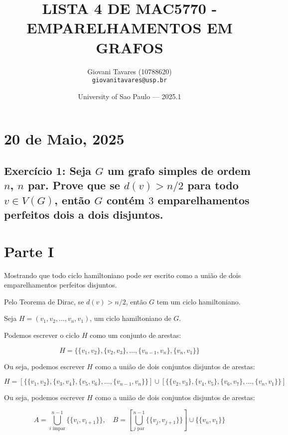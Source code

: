 \documentclass{article}
\title{LISTA 4 DE MAC5770 - EMPARELHAMENTOS EM GRAFOS} %
\author{Giovani Tavares (10788620)\\ \texttt{giovanitavares@usp.br}} %
\date{University of Sao Paulo --- 2025.1} %
\begin{document}
\maketitle %


\section{20 de Maio, 2025} %


 \subsection{Exercício 1:  Seja $G$ um grafo simples de ordem $n$, $n$ par. Prove que se $d(v) > n/2$ para todo $v \in V (G)$, então $G$ contém $3$ emparelhamentos perfeitos dois a dois disjuntos.}
 
 \section*{Parte I}
 
 Mostrando que todo ciclo hamiltoniano pode ser escrito como a união de dois emparelhamentos perfeitos disjuntos.
 
 Pelo Teorema de Dirac, se $d(v) > n/2$, então $G$ tem um ciclo hamiltoniano.
 
 Seja $H = (v_1, v_2, \ldots, v_n, v_1)$, um ciclo hamiltoniano de $G$.
 
 Podemos escrever o ciclo $H$ como um conjunto de arestas:
 
 $$
 H = \{ \{v_1, v_2\}, \{v_2, v_3\}, \ldots, \{v_{n-1}, v_n\}, \{v_n, v_1\} \}
 $$
 
 Ou seja, podemos escrever $H$ como a união de dois conjuntos disjuntos de arestas:
 
 $$
 H = \left[ \{ \{v_1, v_2\}, \{v_3, v_4\}, \{v_5, v_6\}, \ldots, \{v_{n-1}, v_n\} \} \right] \cup
 \left[ \{ \{v_2, v_3\}, \{v_4, v_5\}, \{v_6, v_7\}, \ldots, \{v_n, v_1\} \} \right]
 $$
 
 Ou seja, podemos escrever $H$ como a união de dois conjuntos disjuntos de arestas:
 
 $$
 A = \bigcup_{i \text{ ímpar}}^{n-1} \{ \{v_i, v_{i+1}\} \}, \quad 
 B = [\bigcup_{j \text{ par}}^{n-1} \{ \{v_j, v_{j+1}\} \}] \cup \{ \{v_n, v_1\} \}
 $$
 
\end{document}

